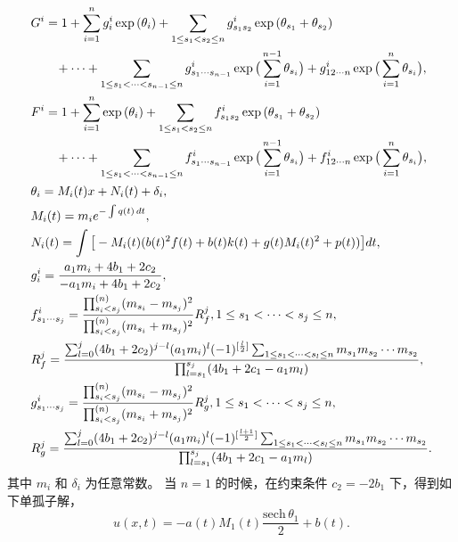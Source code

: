 \begin{align}
\nonumber
& G^{\uppercase\expandafter{\romannumeral 1}}=1+  \sum_{i = 1}^{n} g^{\uppercase\expandafter{\romannumeral 1}}_i \exp{(\theta_i)}
+ \sum_{1 \leq s_1 < s_2 \leq n} g^{\uppercase\expandafter{\romannumeral 1}}_{s_1 s_2}\exp{(\theta_{s_1}+\theta_{s_2})}\\
&\quad\quad +\cdots + \sum_{1 \leq s_1 < \cdots < s_{n-1} \leq n} g^{\uppercase\expandafter{\romannumeral 1}}_{s_1 \cdots s_{n-1}}\exp{\big(\sum_{i = 1}^{n-1} \theta_{s_i} \big )}
+ g^{\uppercase\expandafter{\romannumeral 1}}_{12 \cdots n}\exp{\big(\sum_{i = 1}^{n} \theta_{s_i} \big )},
\\
\nonumber
& F^{\uppercase\expandafter{\romannumeral 1}}=1+  \sum_{i = 1}^{n} \exp{(\theta_i)}
+ \sum_{1 \leq s_1 < s_2 \leq n} f^{\uppercase\expandafter{\romannumeral 1}}_{s_1 s_2}\exp{(\theta_{s_1}+\theta_{s_2})}\\
&\quad\quad +\cdots + \sum_{1 \leq s_1 < \cdots < s_{n-1} \leq n} f^{\uppercase\expandafter{\romannumeral 1}}_{s_1 \cdots s_{n-1}}\exp{\big(\sum_{i = 1}^{n-1} \theta_{s_i} \big )}
+ f^{\uppercase\expandafter{\romannumeral 1}}_{12 \cdots n}\exp{\big(\sum_{i = 1}^{n} \theta_{s_i} \big )},
\\
& \theta_i=M_i(t) x + N_i(t) + \delta_i,
\\ & M_i(t)= m_i e^{-\int q(t) \, dt},\\
 & N_i(t)=\int \big[-M_i(t) (b(t)^2 f(t)+b(t) k(t)+g(t)  M_i(t)^2+p(t))\big] dt,\\
 & g^{\uppercase\expandafter{\romannumeral 1}}_i =\frac{a_1 m_i+4 b_1+2 c_2}{-a_1 m_i +4 b_1+2 c_2},\\
& f^{\uppercase\expandafter{\romannumeral 1}}_{s_1 \cdots s_{j}}=\frac{\prod_{s_i < s_j}^{(n)} (m_{s_i}-m_{s_j})^2  }{\prod_{s_i < s_j}^{(n)} (m_{s_i}+m_{s_j})^2} R_f^j, 1 \leq s_1 <\cdots < s_{j} \leq n,\\
& R_f^j =\frac{\sum_{l = 0}^{j}(4 b_1+2 c_2)^{j-l} (a_1 m_i)^{l} (-1)^{[\frac{l}{2}]}
\sum_{1 \leq s_1 < \cdots < s_l \leq n} m_{s_1} m_{s_2} \cdots m_{s_2}}
{\prod_{l = s_1}^{s_j} (4b_1+2c_1-a_1 m_l)},
\\ & g^{\uppercase\expandafter{\romannumeral 1}}_{s_1 \cdots s_{j}}=\frac{\prod_{s_i < s_j}^{(n)} (m_{s_i}-m_{s_j})^2  }{\prod_{s_i < s_j}^{(n)} (m_{s_i}+m_{s_j})^2} R_g^j, 1 \leq s_1 < \cdots < s_{j} \leq n,
\\ & R_g^j = \frac{\sum_{l = 0}^{j}(4 b_1+2 c_2)^{j-l} (a_1 m_i)^{l} (-1)^{[\frac{l+1}{2}]}
\sum_{1 \leq s_1 < \cdots < s_l \leq n} m_{s_1} m_{s_2} \cdots m_{s_2}}
{\prod_{l = s_1}^{s_j} (4b_1+2c_1-a_1 m_l)}.
\end{align}
其中 $m_i$ 和 $\delta_i$ 为任意常数。
当 $n=1$ 的时候，在约束条件 $c_2 = -2 b_1$ 下，得到如下单孤子解，
\begin{equation}
u(x,t)=-a(t) M_1(t)\frac{\text{sech}\, \theta_1}{2}+b(t). \label{mkdv-single}
\end{equation}

